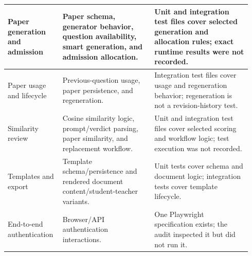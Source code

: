 \begin{table}[H]
\begin{tabular}{|p{0.20\linewidth}|p{0.36\linewidth}|p{0.38\linewidth}|}
        \hline
        Paper generation and admission & Paper schema, generator behavior, question availability, smart generation, and admission allocation. & Unit and integration test files cover selected generation and allocation rules; exact runtime results were not recorded. \\
        \hline
        Paper usage and lifecycle & Previous-question usage, paper persistence, and regeneration. & Integration test files cover usage and regeneration behavior; regeneration is not a revision-history test. \\
        \hline
        Similarity review & Cosine similarity logic, prompt/verdict parsing, paper similarity, and replacement workflow. & Unit and integration test files cover selected scoring and workflow logic; test execution was not recorded. \\
        \hline
        Templates and export & Template schema/persistence and rendered document content/student-teacher variants. & Unit tests cover schema and document logic; integration tests cover template lifecycle. \\
        \hline
        End-to-end authentication & Browser/API authentication interactions. & One Playwright specification exists; the audit inspected it but did not run it. \\
        \hline
    \end{tabular}
\end{table}


